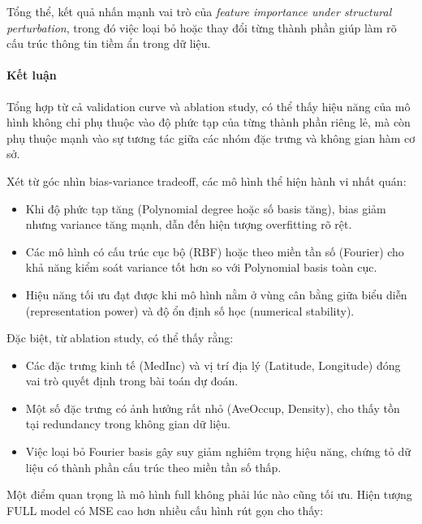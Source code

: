 Tổng thể, kết quả nhấn mạnh vai trò của \textit{feature importance under structural perturbation},
trong đó việc loại bỏ hoặc thay đổi từng thành phần giúp làm rõ cấu trúc thông tin tiềm ẩn
trong dữ liệu.

\paragraph{Kết luận}

Tổng hợp từ cả validation curve và ablation study, có thể thấy hiệu năng của mô hình
không chỉ phụ thuộc vào độ phức tạp của từng thành phần riêng lẻ, mà còn phụ thuộc mạnh
vào sự tương tác giữa các nhóm đặc trưng và không gian hàm cơ sở.

Xét từ góc nhìn bias-variance tradeoff, các mô hình thể hiện hành vi nhất quán:

\begin{itemize}
    \item Khi độ phức tạp tăng (Polynomial degree hoặc số basis tăng), bias giảm
    nhưng variance tăng mạnh, dẫn đến hiện tượng overfitting rõ rệt.

    \item Các mô hình có cấu trúc cục bộ (RBF) hoặc theo miền tần số (Fourier)
    cho khả năng kiểm soát variance tốt hơn so với Polynomial basis toàn cục.

    \item Hiệu năng tối ưu đạt được khi mô hình nằm ở vùng cân bằng giữa biểu diễn
    (representation power) và độ ổn định số học (numerical stability).
\end{itemize}

Đặc biệt, từ ablation study, có thể thấy rằng:

\begin{itemize}
    \item Các đặc trưng kinh tế (MedInc) và vị trí địa lý (Latitude, Longitude)
    đóng vai trò quyết định trong bài toán dự đoán.

    \item Một số đặc trưng có ảnh hưởng rất nhỏ (AveOccup, Density),
    cho thấy tồn tại redundancy trong không gian dữ liệu.

    \item Việc loại bỏ Fourier basis gây suy giảm nghiêm trọng hiệu năng,
    chứng tỏ dữ liệu có thành phần cấu trúc theo miền tần số thấp.
\end{itemize}

Một điểm quan trọng là mô hình full không phải lúc nào cũng tối ưu.
Hiện tượng FULL model có MSE cao hơn nhiều cấu hình rút gọn cho thấy:

